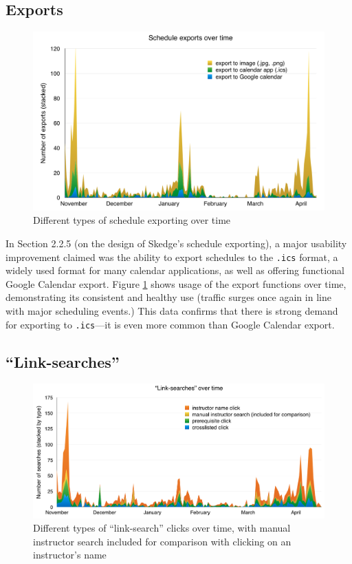\subsection{Exports}

\begin{figure}
  \centering
  \includegraphics[width=12cm]{images/graph/exports}

  \caption{Different types of schedule exporting over time}
  \label{fig:exports}
\end{figure}

In Section 2.2.5 (on the design of Skedge's schedule exporting), a major usability improvement claimed was the ability to export schedules to the {\tt .ics} format, a widely used format for many calendar applications, as well as offering functional Google Calendar export. Figure \ref{fig:exports} shows usage of the export functions over time, demonstrating its consistent and healthy use (traffic surges once again in line with major scheduling events.) This data confirms that there is strong demand for exporting to {\tt .ics}---it is even more common than Google Calendar export.

\subsection{``Link-searches''}

\begin{figure}
  \centering
  \includegraphics[width=1.0\textwidth]{images/graph/linksearches}

  \caption{Different types of ``link-search'' clicks over time, with manual instructor search included for comparison with clicking on an instructor's name}
  \label{fig:linksearches}
\end{figure}

